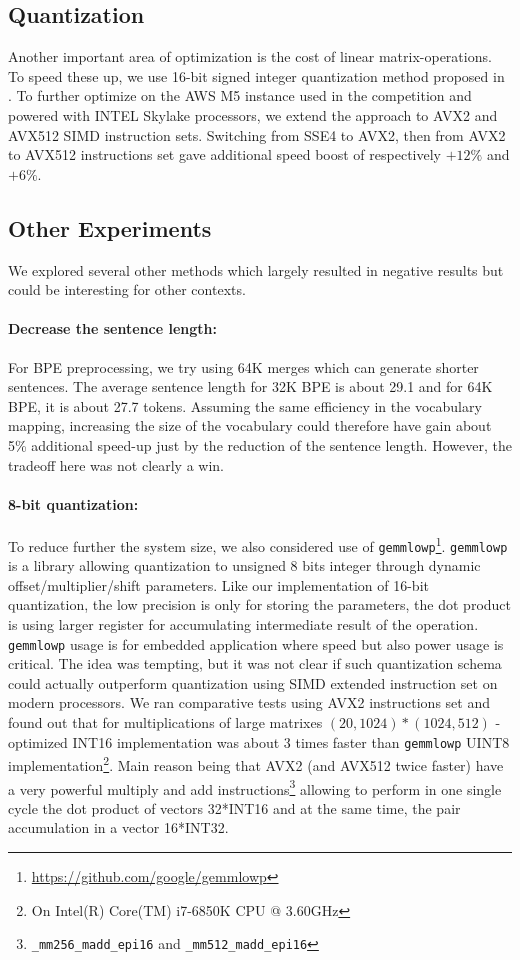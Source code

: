 \documentclass[11pt,a4paper]{article}
\begin{document}
\subsection{Quantization}
\label{quantize}
Another important area of optimization is the cost of linear
matrix-operations.  To speed these up, we use 16-bit signed integer
quantization method proposed in .
To further optimize on the AWS M5 instance used in the
competition and powered with INTEL Skylake processors, we extend the
approach to AVX2 and AVX512 SIMD instruction sets. Switching from SSE4 to AVX2, then from
AVX2 to AVX512 instructions set gave additional speed boost of
respectively $+12\%$ and $+6\%$.

\subsection{Other Experiments}
We explored several other methods which largely resulted in
negative results but could be interesting for other contexts.

\paragraph{Decrease the sentence length:}
For BPE preprocessing, we try using 64K merges which can generate shorter sentences.
The average sentence length for 32K BPE is about 29.1 and for 64K BPE, it is about 27.7 tokens. Assuming the same efficiency in the vocabulary mapping, increasing the size of the vocabulary could therefore have gain about 5\% additional speed-up just by the reduction of the sentence length. However, the tradeoff here was not clearly a win.

 \paragraph{8-bit quantization:}
To reduce further the system size, we also considered use of {\tt gemmlowp}\footnote{\url{https://github.com/google/gemmlowp}}. {\tt gemmlowp} is a library allowing quantization to unsigned 8 bits integer through dynamic offset/multiplier/shift parameters. Like our implementation of 16-bit quantization, the low precision is only for storing the parameters, the dot product is using larger register for accumulating intermediate result of the operation. {\tt gemmlowp} usage is for embedded application where speed but also power usage is critical. The idea was tempting, but it was not clear if such quantization schema could actually outperform quantization using SIMD extended instruction set on modern processors. We ran  comparative tests using AVX2 instructions set and found out that for multiplications of large matrixes $(20,1024) * (1024,512)$ - optimized INT16 implementation was about 3 times faster than  {\tt gemmlowp} UINT8 implementation\footnote{On Intel(R) Core(TM) i7-6850K CPU @ 3.60GHz}. Main reason being that AVX2 (and AVX512 twice faster) have a very powerful multiply and add instructions\footnote{{\tt \_mm256\_madd\_epi16} and {\tt \_mm512\_madd\_epi16}} allowing to perform in one single cycle the dot product of vectors 32*INT16 and at the same time, the pair accumulation in a vector 16*INT32.
\end{document}
